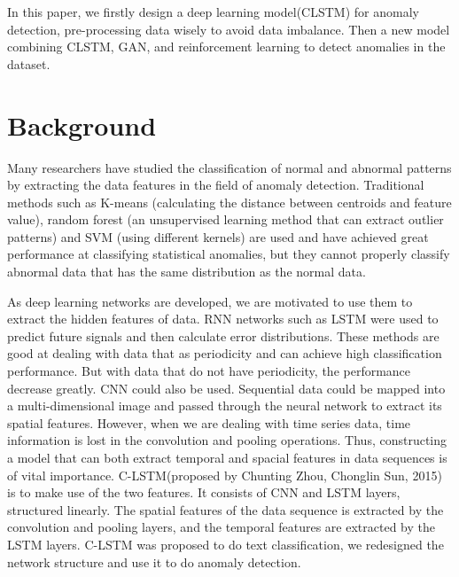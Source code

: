 \documentclass{acmtog} %
\begin{document}
In this paper, we firstly design a deep learning model(CLSTM) for anomaly detection, pre-processing data wisely to avoid data imbalance. Then a new model combining CLSTM, GAN, and reinforcement learning to detect anomalies in the dataset.

\section{Background}
Many researchers have studied the classification of normal and abnormal patterns by extracting the data features in the field of anomaly detection. Traditional methods such as K-means (calculating the distance between centroids and feature value), random forest (an unsupervised learning method that can extract outlier patterns) and SVM (using different kernels) are used and have achieved great performance at classifying statistical anomalies, but they cannot properly classify abnormal data that has the same distribution as the normal data. 

As deep learning networks are developed, we are motivated to use them to extract the hidden features of data. RNN networks such as LSTM were used to predict future signals and then calculate error distributions. These methods are good at dealing with data that as periodicity and can achieve high classification performance. But with data that do not have periodicity, the performance decrease greatly. CNN could also be used. Sequential data could be mapped into a multi-dimensional image and passed through the neural network to extract its spatial features. However, when we are dealing with time series data, time information is lost in the convolution and pooling operations. Thus, constructing a model that can both extract temporal and spacial features in data sequences is of vital importance. C-LSTM(proposed by Chunting Zhou, Chonglin Sun, 2015\cite{bibitem6}) is to make use of the two features. It consists of CNN and LSTM layers, structured linearly. The spatial features of the data sequence is extracted by the convolution and pooling layers, and the temporal features are extracted by the LSTM layers. C-LSTM was proposed to do text classification, we redesigned the network structure and use it to do anomaly detection.
\end{document}

